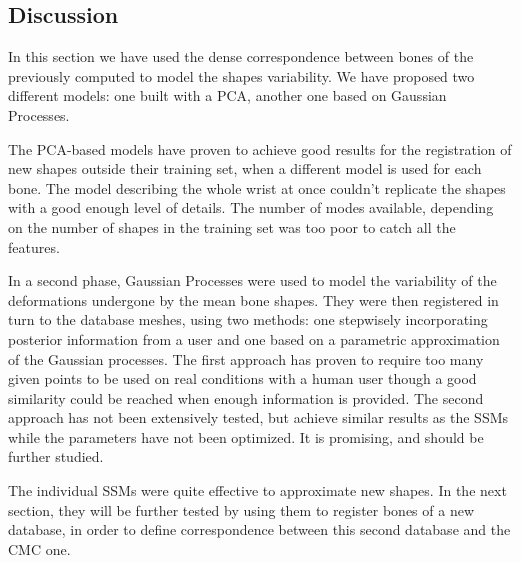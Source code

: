 \subsection{Discussion}

In this section we have used the dense correspondence between bones of the \db* previously computed to model the shapes variability. We have proposed two different models: one built with a PCA, another one based on Gaussian Processes. 

The PCA-based models have proven to achieve good results for the registration of new shapes outside their training set, when a different model is used for each bone. The model describing the whole wrist at once couldn't replicate the shapes with a good enough level of details. The number of modes available, depending on the number of shapes in the training set was too poor to catch all the features. 

In a second phase, Gaussian Processes were used to model the variability of the deformations undergone by the mean bone shapes. They were then registered in turn to the database meshes, using two methods: one stepwisely incorporating posterior information from a user and one based on a parametric approximation of the Gaussian processes. The first approach has proven to require too many given points to be used on real conditions with a human user though a good similarity could be reached when enough information is provided. The second approach has not been extensively tested, but achieve similar results as the SSMs while the parameters have not been optimized. It is promising, and should be further studied. 

The individual SSMs were quite effective to approximate new shapes. In the next section, they will be further tested by using them to register bones of a new database, in order to define correspondence between this second database and the CMC one. 
